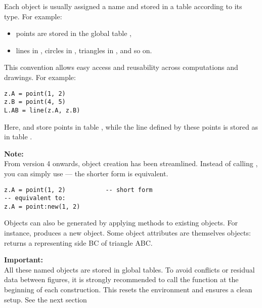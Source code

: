 Each object is usually assigned a name and stored in a table according to its type. For example:
\begin{itemize}
  \item points are stored in the global table ,
  \item lines in , circles in , triangles in , and so on.
\end{itemize}

This convention allows easy access and reusability across computations and drawings. For example:

\begin{mybox}
\begin{verbatim}
z.A = point(1, 2)
z.B = point(4, 5)
L.AB = line(z.A, z.B)
\end{verbatim}
\end{mybox}

\noindent
Here,  and  store points in table , while the line defined by these points is stored as  in table .

\vspace{1em}
\tkzRHand{} \textbf{Note:} \\
From version 4 onwards, object creation has been streamlined. Instead of calling , you can simply use  — the shorter form is equivalent.

\begin{mybox}
\begin{verbatim}
z.A = point(1, 2)           -- short form
-- equivalent to:
z.A = point:new(1, 2)
\end{verbatim}
\end{mybox}

Objects can also be generated by applying methods to existing objects. For instance,  produces a new  object. Some object attributes are themselves objects:  returns a  representing side BC of triangle ABC.

\vspace{1em}
\tkzRHand{} \textbf{Important:} \\
All these named objects are stored in global tables. To avoid conflicts or residual data between figures, it is strongly recommended to call the function  at the beginning of each construction. This resets the environment and ensures a clean setup. See the next section

